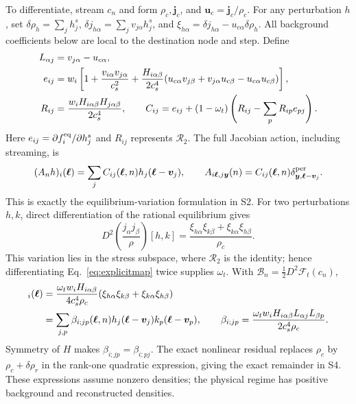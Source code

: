\documentclass[10pt,letterpaper]{article}
\newcommand{\F}{\mathcal F}\newcommand{\B}{\mathcal B}
\begin{document}
To differentiate, stream $c_n$ and form $\rho_c,\bm j_c$, and $\bm u_c=\bm j_c/\rho_c$. For any perturbation $h$, set $\delta\rho_h=\sum_jh_j^s$, $\delta j_{h\alpha}=\sum_jv_{j\alpha}h_j^s$, and $\xi_{h\alpha}=\delta j_{h\alpha}-u_{c\alpha}\delta\rho_h$. All background coefficients below are local to the destination node and step. Define
\begin{align}
 L_{\alpha j}&=v_{j\alpha}-u_{c\alpha},\notag\\
 e_{ij}&=w_i\left[1+\frac{v_{i\alpha}v_{j\alpha}}{c_s^2}
 +\frac{H_{i\alpha\beta}}{2c_s^4}
 (u_{c\alpha}v_{j\beta}+v_{j\alpha}u_{c\beta}-u_{c\alpha}u_{c\beta})\right],\\
 R_{ij}&=\frac{w_iH_{i\alpha\beta}H_{j\alpha\beta}}{2c_s^4},\qquad
 C_{ij}=e_{ij}+(1-\omega_t)\left(R_{ij}-\sum_pR_{ip}e_{pj}\right).
\end{align}
Here $e_{ij}=\partial f_i^{\rm eq}/\partial h_j^s$ and $R_{ij}$ represents $\mathcal R_2$. The full Jacobian action, including streaming, is
\begin{equation}
 (A_nh)_i(\bm\ell)=\sum_jC_{ij}(\bm\ell,n)h_j(\bm\ell-\bm v_j),\qquad
 A_{i\bm\ell,j\bm y}(n)=C_{ij}(\bm\ell,n)\delta^{\rm per}_{\bm y,\bm\ell-\bm v_j}.
 \label{eq:explicitA}
\end{equation}
This is exactly the equilibrium-variation formulation in S2. For two perturbations $h,k$, direct differentiation of the rational equilibrium gives
\begin{equation}
 D^2\!\left(\frac{j_\alpha j_\beta}{\rho}\right)[h,k]
 =\frac{\xi_{h\alpha}\xi_{k\beta}+\xi_{k\alpha}\xi_{h\beta}}{\rho_c}.
\end{equation}
This variation lies in the stress subspace, where $\mathcal R_2$ is the identity; hence differentiating Eq.~\eqref{eq:explicitmap} twice supplies $\omega_t$. With $\B_n=\tfrac12D^2\F_t(c_n)$,
\begin{align}
 [\B_n(h\otimes k)]_i(\bm\ell)
 &=\frac{\omega_t w_iH_{i\alpha\beta}}{4c_s^4\rho_c}
 (\xi_{h\alpha}\xi_{k\beta}+\xi_{k\alpha}\xi_{h\beta})\notag\\
 &=\sum_{j,p}\beta_{i;jp}(\bm\ell,n)
 h_j(\bm\ell-\bm v_j)k_p(\bm\ell-\bm v_p),\qquad
 \beta_{i;jp}=\frac{\omega_t w_iH_{i\alpha\beta}L_{\alpha j}L_{\beta p}}{2c_s^4\rho_c}.
 \label{eq:explicitB}
\end{align}
Symmetry of $H$ makes $\beta_{i;jp}=\beta_{i;pj}$. The exact nonlinear residual replaces $\rho_c$ by $\rho_c+\delta\rho_r$ in the rank-one quadratic expression, giving the exact remainder in S4. These expressions assume nonzero densities; the physical regime has positive background and reconstructed densities.
\end{document}
